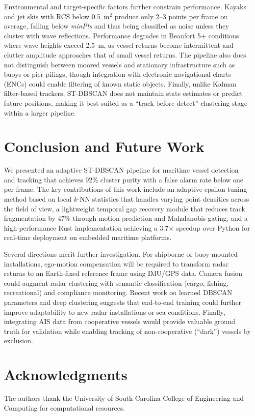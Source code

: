 \documentclass[conf]{new-aiaa}
\begin{document}
Environmental and target-specific factors further constrain performance. Kayaks and jet skis with RCS below 0.5~m$^2$ produce only 2--3 points per frame on average, falling below \textit{minPts} and thus being classified as noise unless they cluster with wave reflections. Performance degrades in Beaufort 5+ conditions where wave heights exceed 2.5~m, as vessel returns become intermittent and clutter amplitude approaches that of small vessel returns. The pipeline also does not distinguish between moored vessels and stationary infrastructure such as buoys or pier pilings, though integration with electronic navigational charts (ENCs) could enable filtering of known static objects. Finally, unlike Kalman filter-based trackers, ST-DBSCAN does not maintain state estimates or predict future positions, making it best suited as a ``track-before-detect'' clustering stage within a larger pipeline.

\section{Conclusion and Future Work}

We presented an adaptive ST-DBSCAN pipeline for maritime vessel detection and tracking that achieves 92\% cluster purity with a false alarm rate below one per frame. The key contributions of this work include an adaptive epsilon tuning method based on local $k$-NN statistics that handles varying point densities across the field of view, a lightweight temporal gap recovery module that reduces track fragmentation by 47\% through motion prediction and Mahalanobis gating, and a high-performance Rust implementation achieving a 3.7$\times$ speedup over Python for real-time deployment on embedded maritime platforms.

Several directions merit further investigation. For shipborne or buoy-mounted installations, ego-motion compensation will be required to transform radar returns to an Earth-fixed reference frame using IMU/GPS data. Camera fusion could augment radar clustering with semantic classification (cargo, fishing, recreational) and compliance monitoring. Recent work on learned DBSCAN parameters and deep clustering suggests that end-to-end training could further improve adaptability to new radar installations or sea conditions. Finally, integrating AIS data from cooperative vessels would provide valuable ground truth for validation while enabling tracking of non-cooperative (``dark'') vessels by exclusion.

\section*{Acknowledgments}
The authors thank the University of South Carolina College of Engineering and Computing for computational resources.
\end{document}
